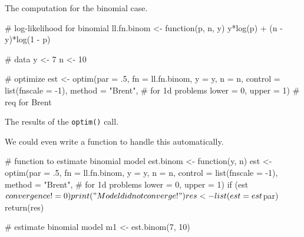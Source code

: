 \documentclass[handout]{beamer}
\begin{document}
\begin{frame}[fragile]
The computation for the binomial case.
\pause \begin{blockcode} 
# log-likelihood for binomial
ll.fn.binom <- function(p, n, y) {
  y*log(p) + (n - y)*log(1 - p)
}
\end{blockcode}

\pause \begin{blockcode}
# data
y <- 7
n <- 10
\end{blockcode}

\pause \begin{blockcode}
# optimize
est <- optim(par = .5, fn = ll.fn.binom, y = y, n = n,
             control = list(fnscale = -1),
             method = "Brent",  # for 1d problems
             lower = 0, upper = 1)  # req for Brent
\end{blockcode}
\end{frame}

\begin{frame}[fragile]
The results of the \texttt{optim()} call.
\end{frame}

\begin{frame}[fragile]
We could even write a function to handle this automatically.
\begin{small}
\pause \begin{blockcode} 
# function to estimate binomial model
est.binom <- function(y, n) {
  est <- optim(par = .5, fn = ll.fn.binom, y = y, n = n,
            control = list(fnscale = -1),
            method = "Brent",  # for 1d problems
            lower = 0, upper = 1)
  if (est$convergence != 0) print("Model did not converge!")
  res <- list(est = est$par)
  return(res)
}
\end{blockcode}

\pause \begin{blockcode}
# estimate binomial model
m1 <- est.binom(7, 10)
\end{blockcode}
\end{small}
\end{frame}
\end{document}
